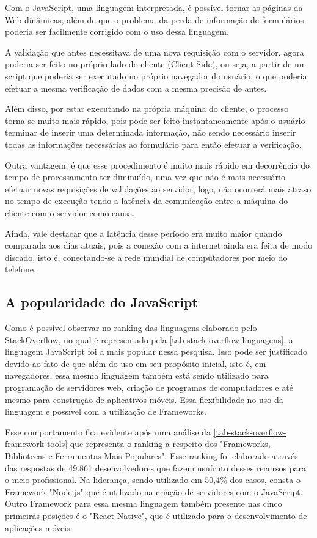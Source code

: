 Com o JavaScript, uma linguagem interpretada, é possível tornar as páginas da Web dinâmicas, além de que o problema da perda de informação de formulários poderia ser facilmente corrigido com o uso dessa linguagem.

A validação que antes necessitava de uma nova requisição com o servidor, agora poderia ser feito no próprio lado do cliente (Client Side), ou seja, a partir de um script que poderia ser executado no próprio navegador do usuário, o que poderia efetuar a mesma verificação de dados com a mesma precisão de antes.

Além disso, por estar executando na própria máquina do cliente, o processo torna-se muito mais rápido, pois pode ser feito instantaneamente após o usuário terminar de inserir uma determinada informação, não sendo necessário inserir todas as informações necessárias ao formulário para então efetuar a verificação.

Outra vantagem, é que esse procedimento é muito mais rápido em decorrência do tempo de processamento ter diminuído, uma vez que não é mais necessário efetuar novas requisições de validações ao servidor, logo, não ocorrerá mais atraso no tempo de execução tendo a latência da comunicação entre a máquina do cliente com o servidor como causa.

Ainda, vale destacar que a latência desse período era muito maior quando comparada aos dias atuais, pois a conexão com a internet ainda era feita de modo discado, isto é, conectando-se a rede mundial de computadores por meio do telefone.

\subsection{A popularidade do JavaScript}
\label{secao-javascript-popularidade}

Como é possível observar no ranking das linguagens elaborado pelo StackOverflow, no qual é representado pela \autoref{tab-stack-overflow-linguagens}, a linguagem JavaScript foi a mais popular nessa pesquisa. Isso pode ser justificado devido ao fato de que além do uso em seu propósito inicial, isto é, em navegadores, essa mesma linguagem também está sendo utilizado para programação de servidores web, criação de programas de computadores e até mesmo para construção de aplicativos móveis. Essa flexibilidade no uso da linguagem é possível com a utilização de Frameworks.

Esse comportamento fica evidente após uma análise da \autoref{tab-stack-overflow-framework-tools} que representa o ranking a respeito dos "Frameworks, Bibliotecas e Ferramentas Mais Populares". Esse ranking foi elaborado através das respostas de 49.861 desenvolvedores que fazem usufruto desses recursos para o meio profissional. Na liderança, sendo utilizado em 50,4\% dos casos, consta o Framework "Node.js" que é utilizado na criação de servidores com o JavaScript. Outro Framework para essa mesma linguagem também presente nas cinco primeiras posições é o "React Native", que é utilizado para o desenvolvimento de aplicações móveis.

